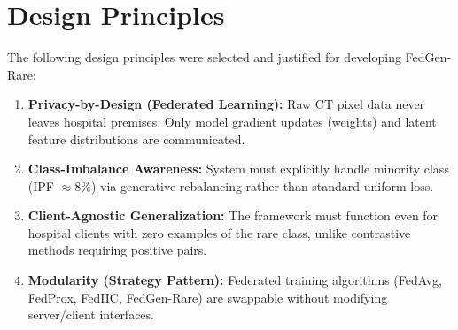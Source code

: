 \documentclass[12pt,a4paper]{report}
\begin{document}
\section{Design Principles}
The following design principles were selected and justified for developing FedGen-Rare:

\begin{enumerate}
    \item \textbf{Privacy-by-Design (Federated Learning):} Raw CT pixel data never leaves hospital premises. Only model gradient updates (weights) and latent feature distributions are communicated.
    \item \textbf{Class-Imbalance Awareness:} System must explicitly handle minority class (IPF $\approx8\%$) via generative rebalancing rather than standard uniform loss.
    \item \textbf{Client-Agnostic Generalization:} The framework must function even for hospital clients with zero examples of the rare class, unlike contrastive methods requiring positive pairs.
    \item \textbf{Modularity (Strategy Pattern):} Federated training algorithms (FedAvg, FedProx, FedIIC, FedGen-Rare) are swappable without modifying server/client interfaces.
\end{enumerate}
\end{document}
